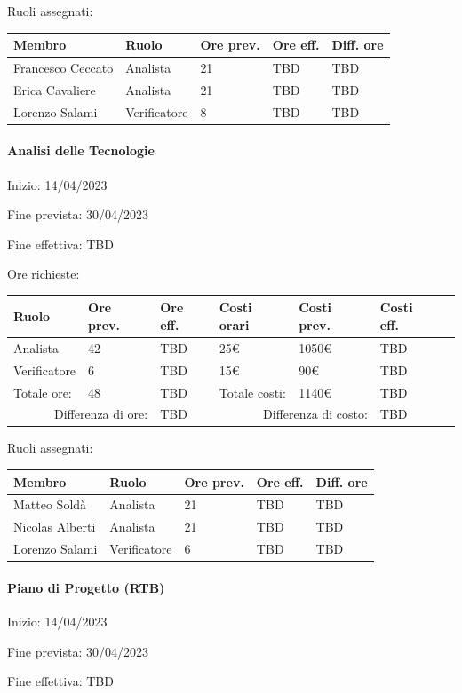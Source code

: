\documentclass[a4paper, 12pt]{article}
\begin{document}
Ruoli assegnati:\\[0.5em]
\begin{tabular}{|l|l|l|l|l|}\hline
Membro & Ruolo & Ore prev. & Ore eff. & Diff. ore \\\hline
Francesco Ceccato & Analista & 21 & TBD & TBD \\\hline
Erica Cavaliere & Analista & 21 & TBD & TBD \\\hline
Lorenzo Salami & Verificatore & 8 & TBD & TBD \\\hline
\end{tabular}

\paragraph{Analisi delle Tecnologie}
Inizio: 14/04/2023\par
Fine prevista: 30/04/2023\par
Fine effettiva: TBD

Ore richieste:\\[0.5em]
\begin{tabular}{|l|l|l||l|l|l|l|}\hline
Ruolo & Ore prev. & Ore eff. & Costi orari & Costi prev. & Costi eff.\\\hline
Analista & 42 & TBD & 25\euro & 1050\euro & TBD \\\hline
Verificatore & 6 & TBD & 15\euro & 90\euro & TBD \\\hline
Totale ore: & 48 & TBD & Totale costi: & 1140\euro & TBD  \\\hline
\multicolumn{2}{|r|}{Differenza di ore:} & TBD & \multicolumn{2}{r|}{Differenza di costo:} & TBD \\\hline
\end{tabular}

Ruoli assegnati:\\[0.5em]
\begin{tabular}{|l|l|l|l|l|}\hline
Membro & Ruolo & Ore prev. & Ore eff. & Diff. ore \\\hline
Matteo Soldà & Analista & 21 & TBD & TBD \\\hline
Nicolas Alberti & Analista & 21 & TBD & TBD \\\hline
Lorenzo Salami & Verificatore & 6  & TBD & TBD \\\hline
\end{tabular}

\paragraph{Piano di Progetto (RTB)}
Inizio: 14/04/2023\par
Fine prevista: 30/04/2023\par
Fine effettiva: TBD
\end{document}
